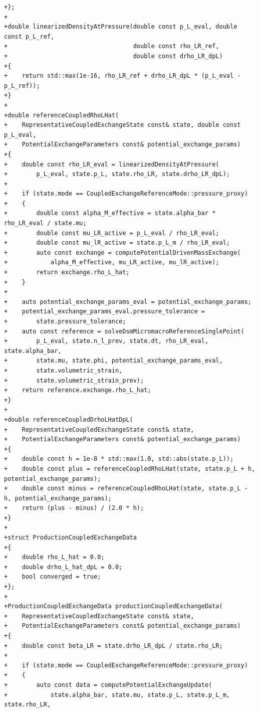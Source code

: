 \documentclass[10pt]{article}
\begin{document}
\begin{lstlisting}
+};
+
+double linearizedDensityAtPressure(double const p_L_eval, double const p_L_ref,
+                                   double const rho_LR_ref,
+                                   double const drho_LR_dpL)
+{
+    return std::max(1e-16, rho_LR_ref + drho_LR_dpL * (p_L_eval - p_L_ref));
+}
+
+double referenceCoupledRhoLHat(
+    RepresentativeCoupledExchangeState const& state, double const p_L_eval,
+    PotentialExchangeParameters const& potential_exchange_params)
+{
+    double const rho_LR_eval = linearizedDensityAtPressure(
+        p_L_eval, state.p_L, state.rho_LR, state.drho_LR_dpL);
+
+    if (state.mode == CoupledExchangeReferenceMode::pressure_proxy)
+    {
+        double const alpha_M_effective = state.alpha_bar * rho_LR_eval / state.mu;
+        double const mu_LR_active = p_L_eval / rho_LR_eval;
+        double const mu_lR_active = state.p_L_m / rho_LR_eval;
+        auto const exchange = computePotentialDrivenMassExchange(
+            alpha_M_effective, mu_LR_active, mu_lR_active);
+        return exchange.rho_L_hat;
+    }
+
+    auto potential_exchange_params_eval = potential_exchange_params;
+    potential_exchange_params_eval.pressure_tolerance =
+        state.pressure_tolerance;
+    auto const reference = solveDsmMicromacroReferenceSinglePoint(
+        p_L_eval, state.n_l_prev, state.dt, rho_LR_eval, state.alpha_bar,
+        state.mu, state.phi, potential_exchange_params_eval,
+        state.volumetric_strain,
+        state.volumetric_strain_prev);
+    return reference.exchange.rho_L_hat;
+}
+
+double referenceCoupledDrhoLHatDpL(
+    RepresentativeCoupledExchangeState const& state,
+    PotentialExchangeParameters const& potential_exchange_params)
+{
+    double const h = 1e-8 * std::max(1.0, std::abs(state.p_L));
+    double const plus = referenceCoupledRhoLHat(state, state.p_L + h, potential_exchange_params);
+    double const minus = referenceCoupledRhoLHat(state, state.p_L - h, potential_exchange_params);
+    return (plus - minus) / (2.0 * h);
+}
+
+struct ProductionCoupledExchangeData
+{
+    double rho_L_hat = 0.0;
+    double drho_L_hat_dpL = 0.0;
+    bool converged = true;
+};
+
+ProductionCoupledExchangeData productionCoupledExchangeData(
+    RepresentativeCoupledExchangeState const& state,
+    PotentialExchangeParameters const& potential_exchange_params)
+{
+    double const beta_LR = state.drho_LR_dpL / state.rho_LR;
+
+    if (state.mode == CoupledExchangeReferenceMode::pressure_proxy)
+    {
+        auto const data = computePotentialExchangeUpdate(
+            state.alpha_bar, state.mu, state.p_L, state.p_L_m, state.rho_LR,

\end{lstlisting}
\end{document}
